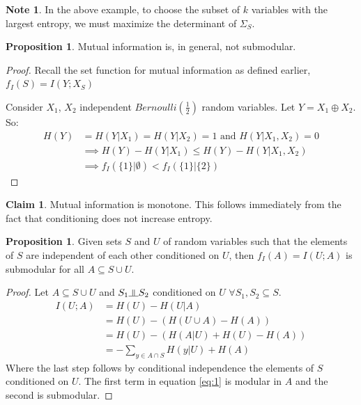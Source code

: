 \documentclass[twoside]{article}
\newcommand*\xor{\mathbin{\oplus}}
\newcommand{\indep}{\rotatebox[origin=c]{90}{$\models$}}
\theoremstyle{definition}
\newtheorem{proposition}[theorem]{Proposition}
\newtheorem{claim}[theorem]{Claim}
\newtheorem{note}[theorem]{Note}
\begin{document}
\begin{note}
  In the above example, to choose the subset of $k$ variables with the
  largest entropy, we must maximize the determinant of $\Sigma_S$.
\end{note}

\begin{proposition}
  Mutual information is, in general, not submodular.
\end{proposition}
\begin{proof}
  Recall the set function for mutual information as defined earlier, $f_I(S) = I(Y; X_S)$

  Consider $X_1$, $X_2$
  independent $Bernoulli(\frac{1}{2})$ random variables. Let $Y = X_1
  \xor X_2$. So:
  \begin{align*}
    H(Y) &= H (Y | X_1) = H (Y | X_2) = 1  \text{ and } H (Y | X_1,
           X_2) = 0 \\
         & \implies H(Y) - H(Y | X_1) \leq H (Y) - H (Y | X_1, X_2) \\
         & \implies f_I(\{1\} | \emptyset) < f_I(\{1\} | \{2\})
  \end{align*}
\end{proof}

\begin{claim}
  Mutual information is monotone. This follows immediately from
  the fact that conditioning does not increase entropy.
\end{claim}

\begin{proposition}
  Given sets $S$ and $U$ of random variables such that the elements of
  $S$ are independent of each other conditioned on $U$, then $f_I(A) = I(U;
  A)$
  is submodular for all $A \subseteq S \cup U$.
\end{proposition}

\begin{proof}
  Let $A \subseteq S \cup U$ and $S_1 \indep S_2$ conditioned on
  $U$ $ \forall S_1, S_2 \subseteq S$.
  \begin{align} \label{eq:1}
    I(U; A) &= H(U) - H(U | A) \nonumber\\
            &= H(U) - (H(U \cup A) - H(A)) \nonumber\\
            &= H(U) - (H(A | U) + H(U) - H(A)) \nonumber\\
            &= -\sum_{y \in A \cap S} H(y | U) + H(A)
  \end{align}
  Where the last step follows by conditional independence the elements
  of $S$ conditioned on $U$. The first term in equation \ref{eq:1} is
  modular in $A$ and the second is submodular.
\end{proof}
\end{document}
